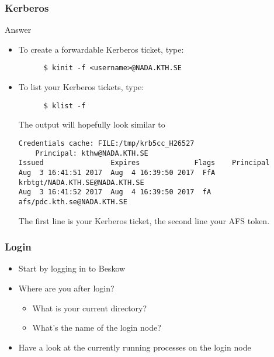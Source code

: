 \begin{frame}[fragile]
  \frametitle{Kerberos}
  \begin{exampleblock}{Answer}
    \verbatimfont{\footnotesize}
    \begin{itemize}
    \item To create a forwardable Kerberos ticket, type:
    \begin{verbatim}
      $ kinit -f <username>@NADA.KTH.SE
    \end{verbatim}

  \item To list your Kerberos tickets, type:
    \begin{verbatim}
      $ klist -f
    \end{verbatim}
    The output will hopefully look similar to
   \begin{verbatim}
Credentials cache: FILE:/tmp/krb5cc_H26527
    Principal: kthw@NADA.KTH.SE
Issued                Expires             Flags    Principal
Aug  3 16:41:51 2017  Aug  4 16:39:50 2017  FfA    krbtgt/NADA.KTH.SE@NADA.KTH.SE
Aug  3 16:41:52 2017  Aug  4 16:39:50 2017  fA     afs/pdc.kth.se@NADA.KTH.SE
   \end{verbatim}
The first line is your Kerberos ticket, the second line your AFS token.
\end{itemize}
\end{exampleblock}

\end{frame}




\begin{frame}[fragile]
  \frametitle{Login}
\begin{itemize}
  \item Start by logging in to Beskow
  \item Where are you after login?
    \begin{itemize}
      \item What is your current directory?
      \item What's the name of the login node?
    \end{itemize}
  \item Have a look at the currently running processes on the login node
\end{itemize}
\end{frame}


